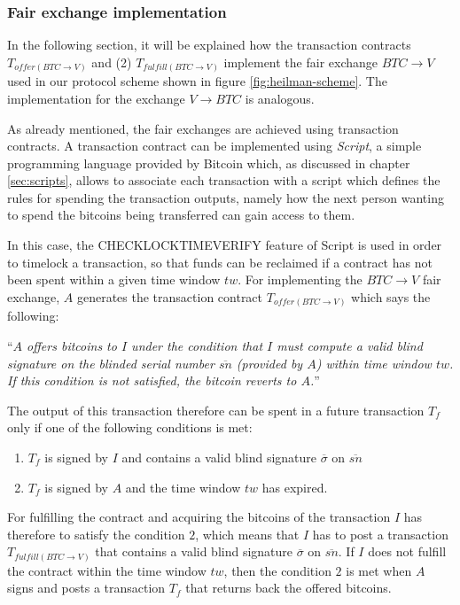 \subsubsection{Fair exchange implementation} In the following section, it will be
explained how the transaction contracts $T_{offer(BTC\rightarrow V)}$ and (2)
$T_{fulfill(BTC\rightarrow V)}$ implement the fair exchange $BTC\rightarrow V$
used in our protocol scheme shown in figure \ref{fig:heilman-scheme}. The
implementation for the exchange $V\rightarrow BTC$ is analogous.

As already mentioned, the fair exchanges are achieved using transaction
contracts. A transaction contract can be implemented using \emph{Script}, a
simple programming language provided by Bitcoin which, as discussed in chapter
\ref{sec:scripts}, allows to associate each transaction with a script which
defines the rules for spending the transaction outputs, namely how the next
person wanting to spend the bitcoins being transferred can gain access to them.

In this case, the CHECKLOCKTIMEVERIFY feature of Script is used in order to
timelock a transaction, so that funds can be reclaimed if a contract has not
been spent within a given time window $tw$. For implementing the $BTC\rightarrow
V$ fair exchange, $A$ generates the transaction contract
$T_{offer(BTC\rightarrow V)}$ which says the following:

``\emph{$A$ offers bitcoins to $I$ under the condition that $I$ must compute a
valid blind signature on the blinded serial number $\overline{sn}$ (provided by $A$)
within time window $tw$. If this condition is not satisfied, the
bitcoin reverts to $A$.}''

The output of this transaction therefore can be spent in a future transaction $T_f$
only if one of the following conditions is met:
\begin{enumerate}
  \item $T_f$ is signed by $I$ and contains a valid blind signature $\overline\sigma$ on $\overline{sn}$
  \item $T_f$ is signed by $A$ and the time window $tw$ has expired.
\end{enumerate}
For fulfilling the contract and acquiring the bitcoins of the transaction $I$
has therefore to satisfy the condition $2$, which means that $I$ has to post a
transaction $T_{fulfill(BTC\rightarrow V)}$ that contains a valid blind
signature $\overline\sigma$ on $\overline{sn}$. If $I$ does not fulfill the
contract within the time window $tw$, then the condition $2$ is met when $A$
signs and posts a transaction $T_f$ that returns back the offered bitcoins.

